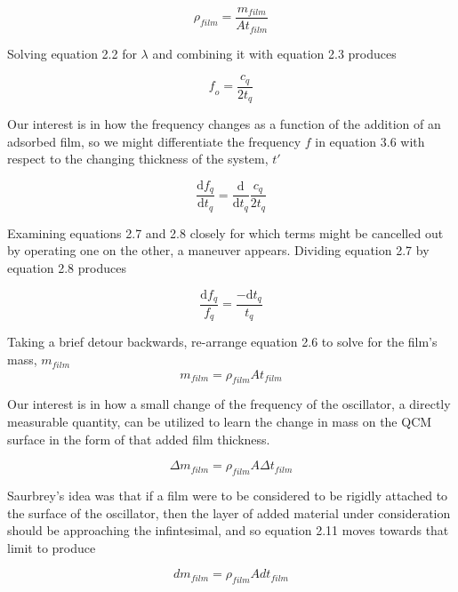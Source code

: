 \begin{equation}
\rho_{film} =  \frac{m_{film}}{A t_{film}}
\end{equation}

Solving equation 2.2 for $\lambda$ and combining it with equation 2.3 produces

\begin{equation}
\mathit{f_{o}} = \frac{c_{q}}{2t_{q}}
\end{equation}

Our interest is in how the frequency changes as a function of the addition of an adsorbed film, so we might differentiate the frequency $f$ in equation 3.6 with respect to the changing thickness of the system, $t'$

\begin{equation}
\frac{\mathrm{d}f_{q} }{\mathrm{d} t_{q}} = \frac{\mathrm{d} }{\mathrm{d}t_{q}}\frac{c_{q}}{2t_{q}}
\end{equation}

Examining equations 2.7 and 2.8 closely for which terms might be cancelled out by operating one on the other, a maneuver appears. Dividing equation 2.7 by equation 2.8 produces

\begin{equation}
\frac{\mathrm{d}f_{q}}{f_{q}} = \frac{-\mathrm{d}t_{q}}{t_{q}}
\end{equation}

Taking a brief detour backwards, re-arrange equation 2.6 to solve for the film's mass, $\mathit{m_{film}}$
\begin{equation}
\mathit{m_{film}} = \rho_{film}A t_{film}
\end{equation}

Our interest is in how a small change of the frequency of the oscillator, a directly measurable quantity, can be utilized to learn the change in mass on the QCM surface in the form of that added film thickness.

\begin{equation}
\Delta \mathit{m_{film}} = \rho_{film}A \Delta t_{film}
\end{equation}

Saurbrey's idea was that if a film were to be considered to be rigidly attached to the surface of the oscillator, then the layer of added material under consideration should be approaching the infintesimal, and so equation 2.11 moves towards that limit to produce


\begin{equation}
d\mathit{m_{film}} = \rho_{film}A dt_{film}
\end{equation}

